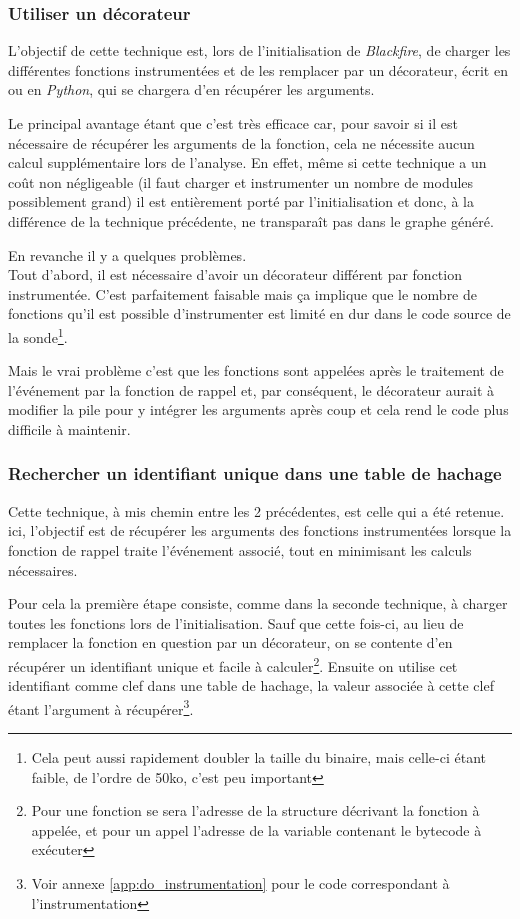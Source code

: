 \subsubsection*{Utiliser un décorateur}
L'objectif de cette technique est, lors de l'initialisation de \emph{Blackfire}, de charger les différentes fonctions instrumentées et de les remplacer par un décorateur, écrit en \C ou en \emph{Python}, qui se chargera d'en récupérer les arguments.

Le principal avantage étant que c'est très efficace car, pour savoir si il est nécessaire de récupérer les arguments de la fonction, cela ne nécessite aucun calcul supplémentaire lors de l'analyse. En effet, même si cette technique a un coût non négligeable (il faut charger et instrumenter un nombre de modules possiblement grand) il est entièrement porté par l'initialisation et donc, à la différence de la technique précédente, ne transparaît pas dans le graphe généré.

En revanche il y a quelques problèmes. \\
Tout d'abord, il est nécessaire d'avoir un décorateur différent par fonction instrumentée. C'est parfaitement faisable mais ça implique que le nombre de fonctions qu'il est possible d'instrumenter est limité en dur dans le code source de la sonde\footnote{Cela peut aussi rapidement doubler la taille du binaire, mais celle-ci étant faible, de l'ordre de 50ko, c'est peu important}.
 
Mais le vrai problème c'est que les fonctions sont appelées après le traitement de l'événement par la fonction de rappel et, par conséquent, le décorateur aurait à modifier la pile pour y intégrer les arguments après coup et cela rend le code plus difficile à maintenir.

\subsubsection*{Rechercher un identifiant unique dans une table de hachage}
Cette technique, à mis chemin entre les 2 précédentes, est celle qui a été retenue. ici, l'objectif est de récupérer les arguments des fonctions instrumentées lorsque la fonction de rappel traite l'événement associé, tout en minimisant les calculs nécessaires.

Pour cela la première étape consiste, comme dans la seconde technique, à charger toutes les fonctions lors de l’initialisation. Sauf que cette fois-ci, au lieu de remplacer la fonction en question par un décorateur, on se contente d'en récupérer un identifiant unique et facile à calculer\footnote{Pour une fonction \C se sera l'adresse de la structure décrivant la fonction \C à appelée, et pour un appel \Python l'adresse de la variable contenant le bytecode à exécuter}. Ensuite on utilise cet identifiant comme clef dans une table de hachage, la valeur associée à cette clef étant l'argument à récupérer\footnote{Voir annexe \vref{app:do_instrumentation} pour le code correspondant à l'instrumentation}.

